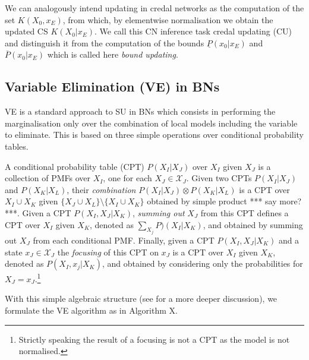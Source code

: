 We can analogously intend updating in credal networks as the computation of the set $K(X_0,x_E)$, from which, by elementwise normalisation we obtain the updated CS $K(X_0|x_E)$. We call this CN inference task credal updating (CU) and distinguish it from the computation of the bounds $\underline{P}(x_0|x_E)$ and $\overline{P}(x_0|x_E)$ which is called here \emph{bound updating}.

\subsection{Variable Elimination (VE) in BNs}
VE is a standard approach to SU in BNs which consists in performing the marginalisation only over the combination of local models including the variable to eliminate. This is based on three simple operations over conditional probability tables.

A conditional probability table (CPT) $P(X_I|X_J)$ over $X_I$ given $X_J$ is a collection of PMFs over $X_I$, one for each $X_J\in\mathcal{X}_J$. Given two CPTs $P(X_I|X_J)$ and $P(X_K|X_L)$, their \emph{combination} $P(X_I|X_J)\otimes P(X_K|X_L)$ is a CPT over $X_I \cup X_K$ given $\{X_J \cup X_L\} \setminus \{ X_I \cup X_K\}$ obtained by simple product *** say more? ***. Given a CPT $P(X_I,X_J|X_K)$, \emph{summing out} $X_J$ from this CPT defines a CPT over $X_I$ given $X_K$, denoted as $\sum_{X_j} P)(X_I|X_K)$, and obtained by summing out $X_J$ from each conditional PMF. Finally, given a CPT $P(X_I,X_J|X_K)$ and a state $x_J\in\mathcal{X}_J$ the \emph{focusing} of this CPT on $x_J$ is a CPT over $X_I$ given $X_K$, denoted as $P(X_I,x_j|X_K)$, and obtained by considering only the probabilities for $X_J=x_J$.\footnote{Strictly speaking the result of a focusing is not a CPT as the model is not normalised.}


With this simple algebraic structure (see \cite{kohlas2003} for a more deeper discussion), we formulate the VE algorithm as in Algorithm X.


